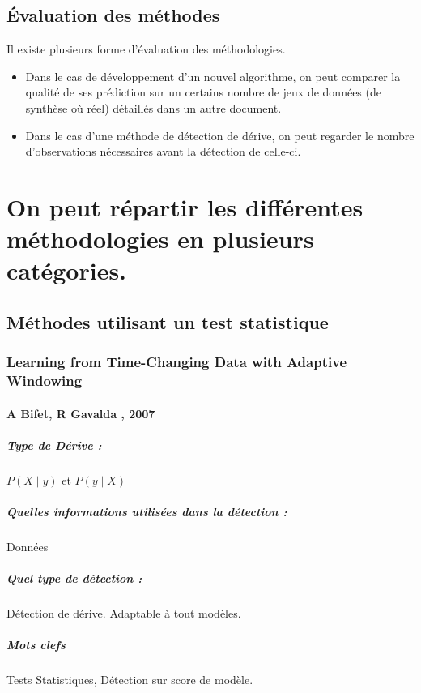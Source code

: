 \documentclass[11pt,a4paper]{report}
\begin{document}
\section*{Évaluation des méthodes}

Il existe plusieurs forme d'évaluation des méthodologies. 
\begin{itemize}
\item Dans le cas de développement d'un nouvel algorithme, on peut comparer la qualité de ses prédiction sur un certains nombre de jeux de données (de synthèse où réel) détaillés dans un autre document.
\item Dans le cas d'une méthode de détection de dérive, on peut regarder le nombre d'observations nécessaires avant la détection de celle-ci.
\end{itemize}

\chapter{On peut répartir les différentes méthodologies en plusieurs catégories.}
\section{Méthodes utilisant un test statistique}

\subsection{Learning from Time-Changing Data with Adaptive Windowing}
\subsubsection{A Bifet, R Gavalda , 2007}

\paragraph{Type de Dérive :} $P(X\mid y)$ et $P(y \mid X)$
\paragraph{Quelles informations utilisées dans la détection :} Données
\paragraph{Quel type de détection :} Détection de dérive. Adaptable à tout modèles.

\paragraph{Mots clefs} Tests Statistiques, Détection sur score de modèle.
\end{document}
